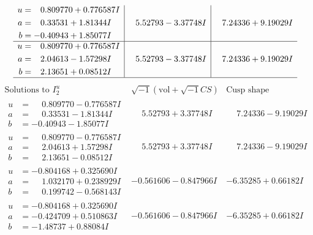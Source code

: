 \documentclass[1p]{elsarticle_modified}
\theoremstyle{definition}
\newcommand{\I}{\sqrt{-1}}
\begin{document}
$$\begin{array}{c|c|c}
\begin{aligned}
u &= \phantom{-}0.809770 + 0.776587 I \\
a &= \phantom{-}0.33531 + 1.81344 I \\
b &= -0.40943 + 1.85077 I\end{aligned}
 & \phantom{-}5.52793 - 3.37748 I & \phantom{-}7.24336 + 9.19029 I \\ \hline\begin{aligned}
u &= \phantom{-}0.809770 + 0.776587 I \\
a &= \phantom{-}2.04613 - 1.57298 I \\
b &= \phantom{-}2.13651 + 0.08512 I\end{aligned}
 & \phantom{-}5.52793 - 3.37748 I & \phantom{-}7.24336 + 9.19029 I\\
 \hline 
 \end{array}$$\newpage$$\begin{array}{c|c|c}  
\text{Solutions to }I^u_{2}& \I (\text{vol} + \sqrt{-1}CS) & \text{Cusp shape}\\
 \hline 
\begin{aligned}
u &= \phantom{-}0.809770 - 0.776587 I \\
a &= \phantom{-}0.33531 - 1.81344 I \\
b &= -0.40943 - 1.85077 I\end{aligned}
 & \phantom{-}5.52793 + 3.37748 I & \phantom{-}7.24336 - 9.19029 I \\ \hline\begin{aligned}
u &= \phantom{-}0.809770 - 0.776587 I \\
a &= \phantom{-}2.04613 + 1.57298 I \\
b &= \phantom{-}2.13651 - 0.08512 I\end{aligned}
 & \phantom{-}5.52793 + 3.37748 I & \phantom{-}7.24336 - 9.19029 I \\ \hline\begin{aligned}
u &= -0.804168 + 0.325690 I \\
a &= \phantom{-}1.032170 + 0.238929 I \\
b &= \phantom{-}0.199742 - 0.568143 I\end{aligned}
 & -0.561606 - 0.847966 I & -6.35285 + 0.66182 I \\ \hline\begin{aligned}
u &= -0.804168 + 0.325690 I \\
a &= -0.424709 + 0.510863 I \\
b &= -1.48737 + 0.88084 I\end{aligned}
 & -0.561606 - 0.847966 I & -6.35285 + 0.66182 I \\ \hline\begin{aligned}

\end{aligned}
\end{array}$$
\end{document}
